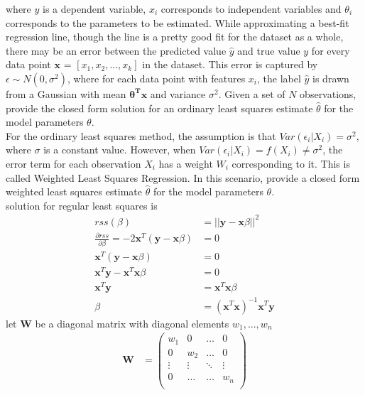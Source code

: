 \documentclass{article}
\begin{document}
where $y$ is a dependent variable, $x_{i}$ corresponds to independent variables and $\theta_{i}$ corresponds to the parameters to be estimated. While approximating a best-fit regression line, though the line is a pretty good fit for the dataset as a whole, there may be an error between the predicted value $\hat y$ and true value $y$ for every data point $\textbf{x}$ = $[x_{1}, x_{2}, ..., x_{k}]$ in the dataset. This error is captured by $\epsilon \sim N(0, \sigma^2)$, where for each data point with features $x_{i}$, the label $\hat y$ is drawn from a Gaussian with mean $\mathbf{\theta^{T}x}$ and variance $\sigma^2$. Given a set of $N$ observations, provide the closed form solution for an ordinary least squares estimate $\hat\theta$ for the model parameters $\theta$.\\
For the ordinary least squares method, the assumption is that $Var(\epsilon_{i}|X_{i}) = \sigma^{2}$, where $\sigma$ is a constant value. However, when $Var(\epsilon_{i}|X_{i}) = f(X_{i}) \neq \sigma^{2}$, the error term for each observation $X_{i}$ has a weight $W_{i}$ corresponding to it. This is called Weighted Least Squares Regression. In this scenario, provide a closed form  weighted least squares estimate $\hat\theta$ for the model parameters $\theta$.
\\
solution for regular least squares is
\begin{align*}
rss(\beta) &= ||\textbf{y} - \textbf{x}\beta|| ^ 2\\
\frac{\partial rss}{\partial \beta} = -2\textbf{x} ^ T(\textbf{y} - \textbf{x}\beta) &= 0\\
\textbf{x} ^ T(\textbf{y} - \textbf{x}\beta) &= 0\\
\textbf{x} ^ T \textbf{y} - \textbf{x} ^ T \textbf{x}\beta &= 0\\
\textbf{x} ^ T \textbf{y} &= \textbf{x} ^ T \textbf{x}\beta\\
\beta &= (\textbf{x} ^ T \textbf{x}) ^ {-1} \textbf{x} ^ T \textbf{y}
\end{align*}
let $\textbf{W}$ be a diagonal matrix with diagonal elements $w_1, ..., w_n$\\
\begin{align*}
\textbf{W} &=
\begin{pmatrix}
w_1 & 0 & \dots & 0\\
0 & w_2 & \dots & 0\\
\vdots & \vdots & \ddots & \vdots\\
0 & \dots & \dots & w_n\\
\end{pmatrix}
\end{align*}
\end{document}
